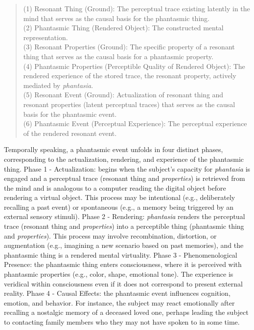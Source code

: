 \documentclass{article}
\begin{document}
\begin{quote}
(1) Resonant Thing (Ground): The perceptual trace existing latently in the mind that serves as the causal basis for the phantasmic thing. \\
(2) Phantasmic Thing (Rendered Object): The constructed mental representation. \\
(3) Resonant Properties (Ground): The specific property of a resonant thing that serves as the causal basis for a phantasmic property. \\
(4) Phantasmic Properties (Perceptible Quality of Rendered Object): The rendered experience of the stored trace, the resonant property, actively mediated by \textit{phantasia}. \\
(5) Resonant Event (Ground): Actualization of resonant thing and resonant properties (latent perceptual traces) that serves as the causal basis for the phantasmic event. \\
(6) Phantasmic Event (Perceptual Experience): The perceptual experience of the rendered resonant event.
\end{quote}

Temporally speaking, a phantasmic event unfolds in four distinct phases, corresponding to the actualization, rendering, and experience of the phantasmic thing. Phase 1 - Actualization: begins when the subject's capacity for \textit{phantasia} is engaged and a perceptual trace (resonant thing and \textit{properties}) is retrieved from the mind and is analogous to a computer reading the digital object before rendering a virtual object. This process may be intentional (e.g., deliberately recalling a past event) or spontaneous (e.g., a memory being triggered by an external sensory stimuli). Phase 2 - Rendering: \textit{phantasia} renders the perceptual trace (resonant thing and \textit{properties}) into a perceptible thing (phantasmic thing and \textit{properties}). This process may involve recombination, distortion, or augmentation (e.g., imagining a new scenario based on past memories), and the phantasmic thing is a rendered mental virtuality. Phase 3 - Phenomenological Presence: the phantasmic thing enters consciousness, where it is perceived with phantasmic properties (e.g., color, shape, emotional tone). The experience is veridical within consciousness even if it does not correspond to present external reality. Phase 4 - Causal Effects: the phantasmic event influences cognition, emotion, and behavior. For instance, the subject may react emotionally after recalling a nostalgic memory of a deceased loved one, perhaps leading the subject to contacting family members who they may not have spoken to in some time.
\end{document}
